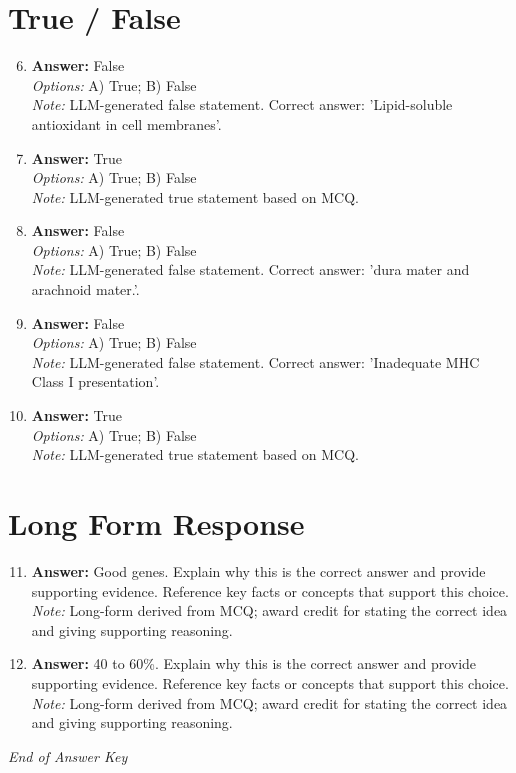 \documentclass[12pt]{article}
\begin{document}
\section*{True / False}
\begin{enumerate}[label=\arabic*.]
\setcounter{enumi}{5}
\item \textbf{Answer:} False
\\ \textit{Options:} A) True; B) False
\\ \textit{Note:} LLM-generated false statement. Correct answer: 'Lipid-soluble antioxidant in cell membranes'.
\item \textbf{Answer:} True
\\ \textit{Options:} A) True; B) False
\\ \textit{Note:} LLM-generated true statement based on MCQ.
\item \textbf{Answer:} False
\\ \textit{Options:} A) True; B) False
\\ \textit{Note:} LLM-generated false statement. Correct answer: 'dura mater and arachnoid mater.'.
\item \textbf{Answer:} False
\\ \textit{Options:} A) True; B) False
\\ \textit{Note:} LLM-generated false statement. Correct answer: 'Inadequate MHC Class I presentation'.
\item \textbf{Answer:} True
\\ \textit{Options:} A) True; B) False
\\ \textit{Note:} LLM-generated true statement based on MCQ.
\end{enumerate}

\section*{Long Form Response}
\begin{enumerate}[label=\arabic*.]
\setcounter{enumi}{10}
\item \textbf{Answer:} Good genes. Explain why this is the correct answer and provide supporting evidence. Reference key facts or concepts that support this choice.
\\ \textit{Note:} Long-form derived from MCQ; award credit for stating the correct idea and giving supporting reasoning.
\item \textbf{Answer:} 40 to 60\%. Explain why this is the correct answer and provide supporting evidence. Reference key facts or concepts that support this choice.
\\ \textit{Note:} Long-form derived from MCQ; award credit for stating the correct idea and giving supporting reasoning.
\end{enumerate}

\vfill
\noindent\textit{End of Answer Key}
\end{document}
